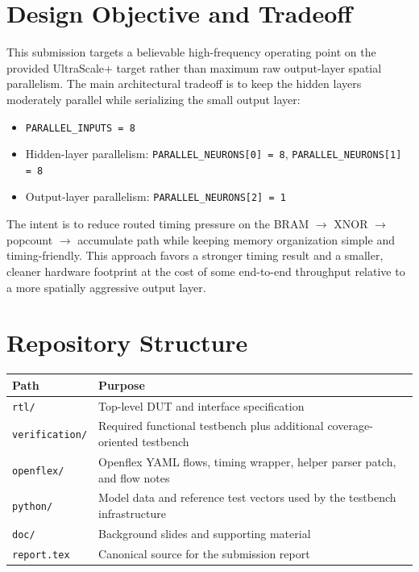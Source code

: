 \documentclass[11pt]{article}
\begin{document}
\section{Design Objective and Tradeoff}

This submission targets a believable high-frequency operating point on the provided UltraScale+ target rather than maximum raw output-layer spatial parallelism. The main architectural tradeoff is to keep the hidden layers moderately parallel while serializing the small output layer:

\begin{itemize}[leftmargin=1.5em]
\item \texttt{PARALLEL\_INPUTS = 8}
\item Hidden-layer parallelism: \texttt{PARALLEL\_NEURONS[0] = 8}, \texttt{PARALLEL\_NEURONS[1] = 8}
\item Output-layer parallelism: \texttt{PARALLEL\_NEURONS[2] = 1}
\end{itemize}

The intent is to reduce routed timing pressure on the BRAM $\rightarrow$ XNOR $\rightarrow$ popcount $\rightarrow$ accumulate path while keeping memory organization simple and timing-friendly. This approach favors a stronger timing result and a smaller, cleaner hardware footprint at the cost of some end-to-end throughput relative to a more spatially aggressive output layer.

\section{Repository Structure}

\begin{tabularx}{\textwidth}{@{}lY@{}}
\toprule
Path & Purpose \\
\midrule
\texttt{rtl/} & Top-level DUT and interface specification \\
\texttt{verification/} & Required functional testbench plus additional coverage-oriented testbench \\
\texttt{openflex/} & Openflex YAML flows, timing wrapper, helper parser patch, and flow notes \\
\texttt{python/} & Model data and reference test vectors used by the testbench infrastructure \\
\texttt{doc/} & Background slides and supporting material \\
\texttt{report.tex} & Canonical source for the submission report \\
\bottomrule
\end{tabularx}
\end{document}
